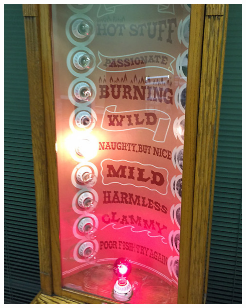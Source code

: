 \documentclass[12pt, block=fill]{beamer}
\begin{document}
\begin{frame}
\begin{columns}
\begin{column}{0.45\textwidth}
  \end{column}
\begin{column}{0.53\textwidth}
\vspace{.5cm}
\includegraphics[width = \textwidth]{figures/love_tester}
  \end{column}
  \end{columns}

\end{frame}
\end{document}
